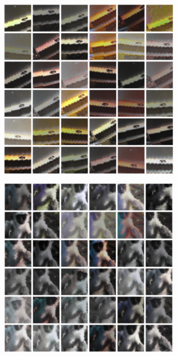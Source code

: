 \documentclass{article} %
\begin{document}
\begin{figure}[h]
\centering
\begin{subfigure}{0.25\textwidth}
  \centering
  \includegraphics[width=\textwidth]{figs/patch_noflip_lines.png}
\end{subfigure}
\begin{subfigure}{0.25\textwidth}
  \centering
  \includegraphics[width=\textwidth]{figs/patch_noflip_lemur.png}

\end{subfigure}
\end{figure}
\end{document}
